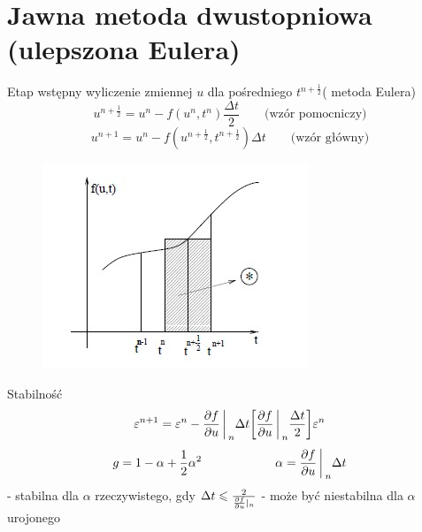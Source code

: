 \section{Jawna metoda dwustopniowa (ulepszona Eulera)}
\begin{frame}{Etap wstępny}
	wyliczenie zmiennej $u$ dla pośredniego $t^{n+\frac{1}{2}}$( metoda Eulera)
    $$u^{n+\frac{1}{2}} = u^n - f(u^n,t^n)\frac{\Delta t}{2} \qquad \text{(wzór pomocniczy)}$$
    $$u^{n+1} = u^n - f(u^{n+\frac{1}{2}},t^{n+\frac{1}{2}})\Delta t \qquad \text{(wzór główny)}$$
\end{frame}
\begin{frame}
	 \begin{figure}
	\includegraphics[height=0.6\textheight]{img/22/metoda_skokowa.jpg}
	\end{figure}
\end{frame}
\begin{frame}{Stabilność}
	$$\varepsilon^{n+1} = \varepsilon^n - \frac{\partial f}{\partial u}\bigg\arrowvert_n\Delta t\bigg[\frac{\partial f}{\partial u} \bigg\arrowvert_n\frac{\Delta t}{2}\bigg]\varepsilon^n$$
    $$g = 1-\alpha +\frac{1}{2}\alpha^2 \qquad \qquad \qquad \alpha = \frac{\partial f}{\partial u}\bigg\arrowvert_n \Delta t$$
    \newline
    - stabilna dla $\alpha$ rzeczywistego, gdy $\Delta t \leqslant \frac{2}{\frac{\partial f}{\partial u}\arrowvert_n}$
    \newline
    - może być niestabilna dla $\alpha$ urojonego
\end{frame}
